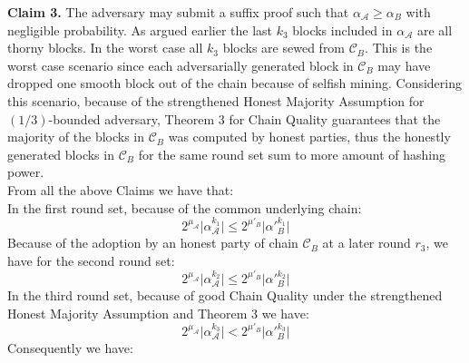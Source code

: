 
\textbf{Claim 3.} The adversary may submit a suffix proof such that $\alpha_\mathcal{A} \geq \alpha_B$
with negligible probability.
As argued earlier the last $k_3$ blocks included in $\alpha_\mathcal{A}$ are all thorny blocks. In the worst case  all $k_3 $ blocks
are sewed from $\mathcal{C}_B$. This is the worst case scenario since each adversarially
generated block in $\mathcal{C}_B$ may have dropped one smooth block out of the chain
because of selfish mining. Considering this scenario, because of the strengthened
Honest Majority Assumption for $(1/3)$-bounded adversary, Theorem 3 for Chain
Quality guarantees that the majority of the blocks in $\mathcal{C}_B$ was computed by
honest parties, thus the honestly generated blocks in $\mathcal{C}_B$ for the same round
set sum to more amount of hashing power.\\
From all the above Claims we have that:\\
In the first round set, because of the common underlying chain:
\begin{equation} \label{eq_v_round_set_1}
2^{\mu_\mathcal{A}} \vert \alpha_\mathcal{A}^{k_1} \vert \leq 2^{\mu'_B} \vert \alpha'{_B^{k_1}} \vert
\end{equation}
Because of the adoption by an honest party of chain $\mathcal{C}_B$ at a later round $r_3$, we
have for the second round set:
\begin{equation} \label{eq_v_round_set_2}
2^{\mu_\mathcal{A}} \vert \alpha_\mathcal{A}^{k_2} \vert \leq 2^{\mu'_B} \vert \alpha'{_B^{k_2}} \vert
\end{equation}
In the third round set, because of good Chain Quality under the strengthened Honest
Majority Assumption and Theorem 3 we have:
\begin{equation} \label{eq_v_round_set_3}
2^{\mu_\mathcal{A}} \vert \alpha_\mathcal{A}^{k_3} \vert < 2^{\mu'_B} \vert \alpha'{_B^{k_3}} \vert
\end{equation}
Consequently we have:

